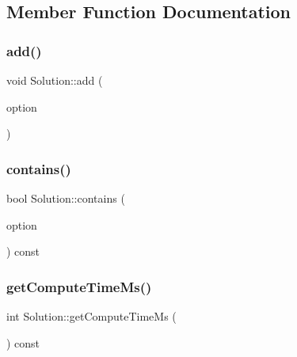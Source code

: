 \subsection{Member Function Documentation}
\mbox{\label{class_solution_ab9df5a4126b96e12dcb998cb0c5fc37a}} 
\subsubsection{\texorpdfstring{add()}{add()}}
{\footnotesize\ttfamily void Solution\+::add (\begin{DoxyParamCaption}\item[{const \hyperlink{class_restoration_plan_1_1_option}{Restoration\+Plan\+::\+Option} $\ast$}]{option }\end{DoxyParamCaption})\hspace{0.3cm}{\ttfamily [inline]}}

\mbox{\label{class_solution_af4e5cc99508f729e1866e0c30c7472a0}} 
\subsubsection{\texorpdfstring{contains()}{contains()}}
{\footnotesize\ttfamily bool Solution\+::contains (\begin{DoxyParamCaption}\item[{const \hyperlink{class_restoration_plan_1_1_option}{Restoration\+Plan\+::\+Option} $\ast$}]{option }\end{DoxyParamCaption}) const\hspace{0.3cm}{\ttfamily [inline]}}

\mbox{\label{class_solution_a7b42da29828c80b924884729cdcd9b43}} 
\subsubsection{\texorpdfstring{get\+Compute\+Time\+Ms()}{getComputeTimeMs()}}
{\footnotesize\ttfamily int Solution\+::get\+Compute\+Time\+Ms (\begin{DoxyParamCaption}{ }\end{DoxyParamCaption}) const\hspace{0.3cm}{\ttfamily [inline]}}

